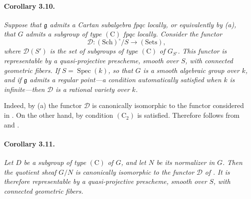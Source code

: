 \paragraph{\textbf{Corollary 3.10.}}
{\itshape Suppose that \(\mathfrak g\) admits a Cartan subalgebra
fpqc locally, or equivalently by \textup{(a)}, that \(G\) admits
a subgroup of type \((\mathrm C)\) fpqc locally. Consider the
functor
\[
  \mathcal D\colon(\mathrm{Sch})^\circ/S\longrightarrow
  (\mathrm{Sets}),
\]
where \(\mathcal D(S')\) is the set of subgroups of type
\((\mathrm C)\) of \(G_{S'}\). This functor is representable by a
quasi-projective prescheme, smooth over \(S\), with connected
geometric fibers. If \(S=\operatorname{Spec}(k)\), so that \(G\)
is a smooth algebraic group over \(k\), and if \(\mathfrak g\)
admits a regular point---a condition automatically satisfied when
\(k\) is infinite---then \(\mathcal D\) is a rational variety over
\(k\).}

Indeed, by \textup{(a)} the functor \(\mathcal D\) is
canonically isomorphic to the functor considered in . On the
other hand, by  condition \((\mathrm C_2)\) is satisfied.
Therefore  follows from  and .

\paragraph{\textbf{Corollary 3.11.}}
{\itshape Let \(D\) be a subgroup of type \((\mathrm C)\) of
\(G\), and let \(N\) be its normalizer in \(G\). Then the quotient
sheaf \(G/N\) is canonically isomorphic to the functor
\(\mathcal D\) of . It is therefore representable by a
quasi-projective prescheme, smooth over \(S\), with connected
geometric fibers.}
